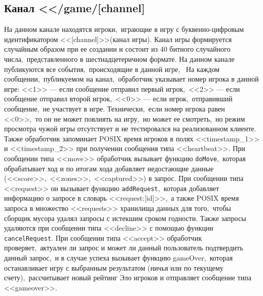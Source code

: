 \documentclass[14pt,a4paper]{report}
\begin{document}
\subsection{Канал <</game/[channel]}
На данном канале находятся игроки,~играющие в игру с буквенно-цифровым идентификатором <<[channel]>>(канал игры). Канал игры формируется случайным образом при ее создании и состоит из 40 битного случайного числа,~представленного в шестнадцетеричном формате. На данном канале публикуются все события,~происходящие в данной игре,~ На каждом сообщении,~публикуемом на канал,~обработчик указывает номер игрока в данной игре: <<1>> --- если сообщение отправил первый игрок,~<<2>> --- если сообщение отправил второй игрок,~<<0>> --- если игрок,~отправивший сообщение,~не участвует в игре. Технически,~если номер игрока равен <<0>>,~то он не может повлиять на игру,~но может ее смотреть,~но режим просмотра чужой игры отсутствует и не тестировался на реализованном клиенте. Также обработчик запоминает POSIX время игроков в полях <<timestamp\_1>> и <<timestamp\_2>> при получении сообщения типа <<heartbeat>>. При сообщении типа <<move>> обработчик вызывает функцию \lstinline$doMove$,~которая обрабатывает ход и по итогам хода добавляет недостающие данные (<<score>>,~<<zones>>,~<<captured>>) в запрос. При сообщении типа <<request>> он вызывает функцию \lstinline$addRequest$,~которая добавляет информацию о запросе в словарь <<request:[id]>>,~а также POSIX время запроса в множество <<requests>> хранилища данных для того,~чтобы сборщик мусора удалял запросы с истекшим сроком годности. Также запросы удаляются при сообщении типа <<decline>> с помощью функции \lstinline$cancelRequest$. При сообщении типа <<accept>> обработчик проверяет,~актуален ли запрос и может ли данный пользователь подтвердить данный запрос,~и в случае успеха вызывает функцию gameOver,~которая останавливает игру с выбранным результатом (ничья или по текущему счету),~рассчитывает новый рейтинг Эло игроков и отправляет сообщение типа <<gameover>>.
\end{document}
